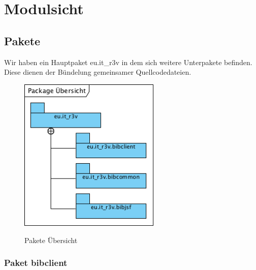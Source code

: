\documentclass[fontsize=12pt,paper=a4,twoside]{scrartcl}
\begin{document}
\section{Modulsicht}
\label{sec:modulsicht}

\subsection{Pakete}
\label{sec:pakete}

Wir haben ein Hauptpaket eu.it\_r3v in dem sich weitere Unterpakete befinden. Diese dienen der Bündelung gemeinsamer Quellcodedateien.

\begin{figure} [H] 
\caption{Pakete Übersicht} \centering
	\includegraphics[width=0.6\textwidth]{Diagramme/PackageUebersicht.png} 
	\label{pic:PackageUebersicht} 
\end{figure}
\label{sec:PackageUebersicht}

\subsubsection{Paket bibclient}
\label{sec:bibclient}
\end{document}
